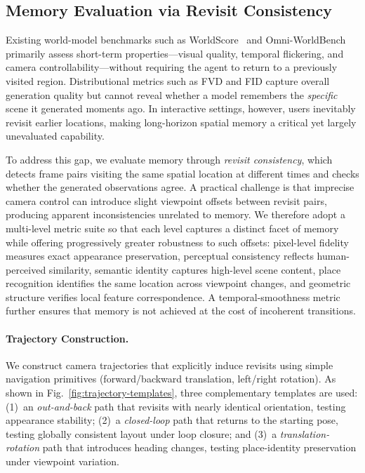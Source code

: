 \documentclass{llmxive}
\begin{document}
\subsection{Memory Evaluation via Revisit Consistency}
\label{sec:memory-eval}

Existing world-model benchmarks such as WorldScore~\citep{duan2025worldscore}
and Omni-WorldBench~\citep{wu2026omniworldbench}
primarily assess short-term properties---visual quality, temporal flickering,
and camera controllability---without requiring the agent
to return to a previously visited region.
Distributional metrics such as FVD and FID capture overall generation quality
but cannot reveal whether a model remembers
the \emph{specific} scene it generated moments ago.
In interactive settings, however, users inevitably revisit earlier locations,
making long-horizon spatial memory a critical yet largely unevaluated capability.

To address this gap, we evaluate memory through \emph{revisit consistency},
which detects frame pairs visiting the same spatial location
at different times and checks whether the generated observations agree.
A practical challenge is that imprecise camera control
can introduce slight viewpoint offsets between revisit pairs,
producing apparent inconsistencies unrelated to memory.
We therefore adopt a multi-level metric suite
so that each level captures a distinct facet of memory
while offering progressively greater robustness to such offsets:
pixel-level fidelity measures exact appearance preservation,
perceptual consistency reflects human-perceived similarity,
semantic identity captures high-level scene content,
place recognition identifies the same location across viewpoint changes,
and geometric structure verifies local feature correspondence.
A temporal-smoothness metric further ensures
that memory is not achieved at the cost of incoherent transitions.

\paragraph{\bf{Trajectory Construction.}}
We construct camera trajectories that explicitly induce revisits
using simple navigation primitives
(forward/backward translation, left/right rotation).
As shown in Fig.~\ref{fig:trajectory-templates},
three complementary templates are used:
(1)~an \emph{out-and-back} path that revisits with nearly identical orientation,
testing appearance stability;
(2)~a \emph{closed-loop} path that returns to the starting pose,
testing globally consistent layout under loop closure;
and (3)~a \emph{translation-rotation} path that introduces heading changes,
testing place-identity preservation under viewpoint variation.
\end{document}
